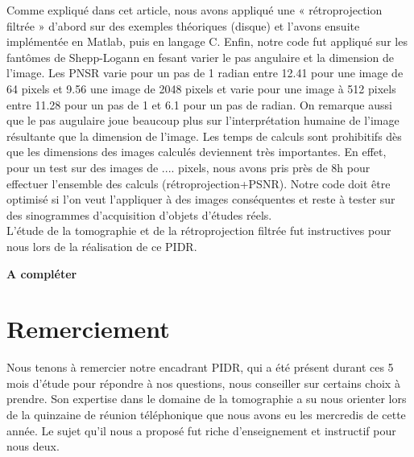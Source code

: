 \documentclass[conference]{IEEEtran}
\begin{document}
Comme expliqué dans cet article, nous avons appliqué une « rétroprojection filtrée » d’abord sur des exemples théoriques (disque) et l’avons ensuite implémentée en Matlab, puis en langage C. Enfin, notre code fut appliqué sur les fantômes de Shepp-Logann en fesant varier le pas angulaire et la dimension de l'image. Les PNSR varie pour un pas de 1 radian entre 12.41 pour une image de 64 pixels et 9.56 une image de 2048 pixels et varie pour une image à 512 pixels entre 11.28 pour un pas de 1 et 6.1 pour un pas de radian. On remarque aussi que le pas augulaire joue beaucoup plus sur l'interprétation humaine de l'image résultante que la dimension de l'image. Les temps de calculs sont prohibitifs dès que les dimensions des images calculés deviennent très importantes. En effet, pour un test sur des images de .... pixels, nous avons pris près de 8h pour effectuer l'ensemble des calculs (rétroprojection+PSNR). Notre code doit être optimisé si l'on veut l'appliquer à des images conséquentes et reste à tester sur des sinogrammes d'acquisition d'objets d'études réels. 
\\
L'étude de la tomographie et de la rétroprojection filtrée fut instructives pour nous lors de la réalisation de ce PIDR.

\textbf{A compléter}






\section*{Remerciement}

Nous tenons à remercier notre encadrant PIDR, qui a été présent durant ces 5 mois d'étude pour répondre à nos questions, nous conseiller sur certains choix à prendre. Son expertise dans le domaine de la tomographie a su nous orienter lors de la quinzaine de réunion téléphonique que nous avons eu les mercredis de cette année. Le sujet qu'il nous a proposé fut riche d'enseignement et instructif pour nous deux.


\end{document}
